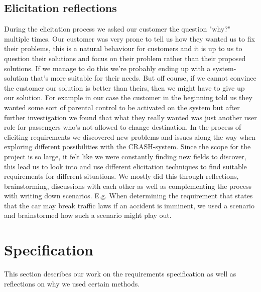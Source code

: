 \documentclass[10pt]{article}
\begin{document}
\subsection{Elicitation reflections}
During the elicitation process we asked our customer the question "why?" multiple times. Our customer was very prone to tell us how they wanted us to fix their problems, this is a natural behaviour for customers and it is up to us to question their solutions and focus on their problem rather than their proposed solutions. If we manage to do this we're probably ending up with a system-solution that's more suitable for their needs. But off course, if we cannot convince the customer our solution is better than theirs, then we might have to give up our solution.
For example in our case the customer in the beginning told us they wanted some sort of parental control to be activated on the system but after further investigation we found that what they really wanted was just another user role for passengers who's not allowed to change destination.
\newline
\indent
In the process of eliciting requirements we discovered new problems and issues along the way when exploring different possibilities with the CRASH-system. Since the scope for the project is so large, it felt like we were constantly finding new fields to discover, this lead us to look into and use different elicitation techniques to find suitable requirements for different situations. We mostly did this through reflections, brainstorming, discussions with each other as well as complementing the process with writing down scenarios. E.g. When determining the requirement that states that the car may break traffic laws if an accident is imminent, we used a scenario and brainstormed how such a scenario might play out. 

\section{Specification}
This section describes our work on the requirements specification as well as reflections on why we used certain methods. 
\end{document}
